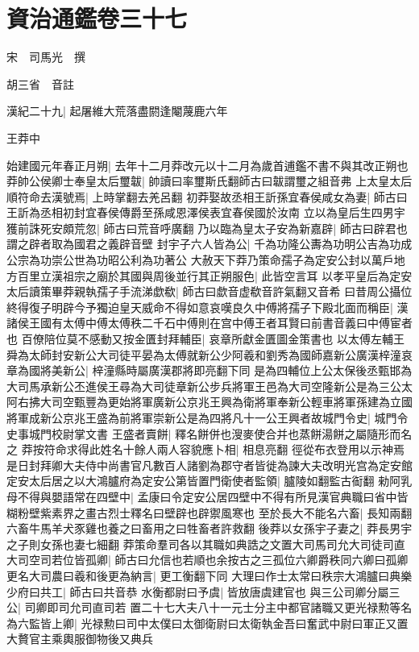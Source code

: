 \chapter{資治通鑑卷三十七}
宋　司馬光　撰

胡三省　音註

漢紀二十九|{
	起屠維大荒落盡閼逢閹蔑鹿六年}


王莽中

始建國元年春正月朔|{
	去年十二月莽改元以十二月為歲首逋鑑不書不與其改正朔也}
莽帥公侯卿士奉皇太后璽韍|{
	帥讀曰率璽斯氏翻師古曰韍謂璽之組音弗}
上太皇太后順符命去漢號焉|{
	上時掌翻去羌呂翻}
初莽娶故丞相王訢孫宜春侯咸女為妻|{
	師古曰王訢為丞相初封宜春侯傳爵至孫咸恩澤侯表宜春侯國於汝南}
立以為皇后生四男宇獲前誅死安頗荒忽|{
	師古曰荒音呼廣翻}
乃以臨為皇太子安為新嘉辟|{
	師古曰辟君也謂之辟者取為國君之義辟音壁}
封宇子六人皆為公|{
	千為功隆公夀為功明公吉為功成公宗為功崇公世為功昭公利為功著公}
大赦天下莽乃策命孺子為定安公封以萬戶地方百里立漢祖宗之廟於其國與周後並行其正朔服色|{
	此皆空言耳}
以孝平皇后為定安太后讀策畢莽親執孺子手流涕歔欷|{
	師古曰歔音虚欷音許氣翻又音希}
曰昔周公攝位終得復子明辟今予獨迫皇天威命不得如意哀嘆良久中傅將孺子下殿北面而稱臣|{
	漢諸侯王國有太傅中傅太傅秩二千石中傅則在宫中傅王者耳賢曰前書音義曰中傅宦者也}
百僚陪位莫不感動又按金匱封拜輔臣|{
	哀章所獻金匱圖金策書也}
以太傅左輔王舜為太師封安新公大司徒平晏為太傅就新公少阿羲和劉秀為國師嘉新公廣漢梓潼哀章為國將美新公|{
	梓潼縣時屬廣漢郡將即亮翻下同}
是為四輔位上公太保後丞甄邯為大司馬承新公丕進侯王尋為大司徒章新公步兵將軍王邑為大司空隆新公是為三公太阿右拂大司空甄豐為更始將軍廣新公京兆王興為衛將軍奉新公輕車將軍孫建為立國將軍成新公京兆王盛為前將軍崇新公是為四將凡十一公王興者故城門令史|{
	城門令史事城門校尉掌文書}
王盛者賣餅|{
	釋名餅併也溲麥使合并也蒸餅湯餅之屬隨形而名之}
莽按符命求得此姓名十餘人兩人容貌應卜相|{
	相息亮翻}
徑從布衣登用以示神焉是日封拜卿大夫侍中尚書官凡數百人諸劉為郡守者皆徙為諫大夫改明光宫為定安館定安太后居之以大鴻臚府為定安公第皆置門衛使者監領|{
	臚陵如翻監古䘖翻}
勑阿乳母不得與嬰語常在四壁中|{
	孟康曰令定安公居四壁中不得有所見漢官典職曰省中皆糊粉壁紫素界之畫古烈士釋名曰壁辟也辟禦風寒也}
至於長大不能名六畜|{
	長知兩翻六畜牛馬羊犬豕雞也養之曰畜用之曰牲畜者許救翻}
後莽以女孫宇子妻之|{
	莽長男宇之子則女孫也妻七細翻}
莽策命羣司各以其職如典誥之文置大司馬司允大司徒司直大司空司若位皆孤卿|{
	師古曰允信也若順也余按古之三孤位六卿爵秩同六卿曰孤卿}
更名大司農曰羲和後更為納言|{
	更工衡翻下同}
大理曰作士太常曰秩宗大鴻臚曰典樂少府曰共工|{
	師古曰共音恭}
水衡都尉曰予虞|{
	皆放唐虞建官也}
與三公司卿分屬三公|{
	司卿即司允司直司若}
置二十七大夫八十一元士分主中都官諸職又更光禄勲等名為六監皆上卿|{
	光禄勲曰司中太僕曰太御衛尉曰太衛執金吾曰奮武中尉曰軍正又置大贅官主乘輿服御物後又典兵}
